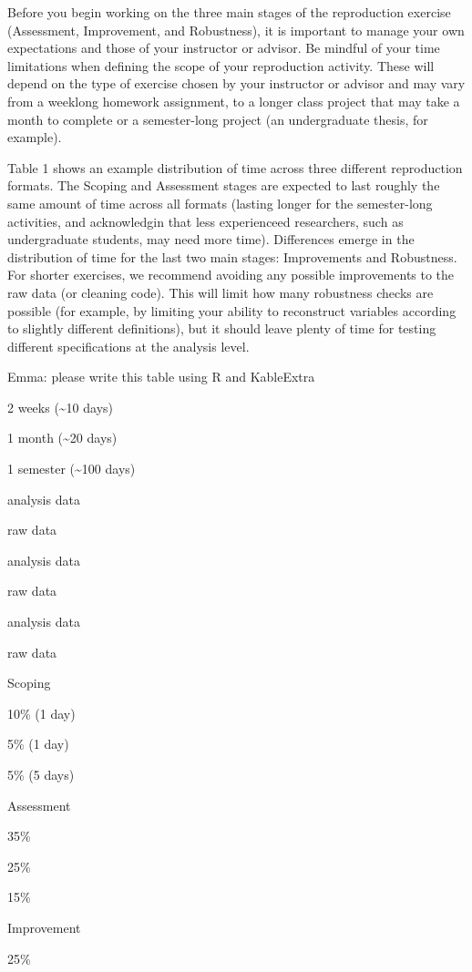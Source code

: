 \documentclass[]{book}
\begin{document}
Before you begin working on the three main stages of the reproduction exercise (Assessment, Improvement, and Robustness), it is important to manage your own expectations and those of your instructor or advisor. Be mindful of your time limitations when defining the scope of your reproduction activity. These will depend on the type of exercise chosen by your instructor or advisor and may vary from a weeklong homework assignment, to a longer class project that may take a month to complete or a semester-long project (an undergraduate thesis, for example).

Table 1 shows an example distribution of time across three different reproduction formats. The Scoping and Assessment stages are expected to last roughly the same amount of time across all formats (lasting longer for the semester-long activities, and acknowledgin that less experienceed researchers, such as undergraduate students, may need more time). Differences emerge in the distribution of time for the last two main stages: Improvements and Robustness. For shorter exercises, we recommend avoiding any possible improvements to the raw data (or cleaning code). This will limit how many robustness checks are possible (for example, by limiting your ability to reconstruct variables according to slightly different definitions), but it should leave plenty of time for testing different specifications at the analysis level.

Emma: please write this table using R and KableExtra

2 weeks (\textasciitilde{}10 days)

1 month (\textasciitilde{}20 days)

1 semester (\textasciitilde{}100 days)

analysis data

raw data

analysis data

raw data

analysis data

raw data

Scoping

10\% (1 day)

5\% (1 day)

5\% (5 days)

Assessment

35\%

25\%

15\%

Improvement

25\%
\end{document}
